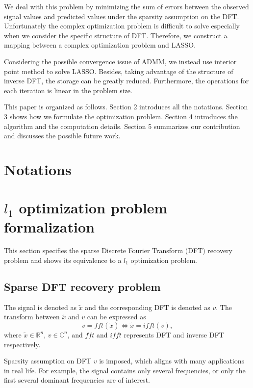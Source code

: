 \documentclass[final,onefignum,onetabnum]{siamart190516}
\newcounter{example}
\begin{document}
We deal with this problem by minimizing the sum of errors between the observed signal values and predicted values under the sparsity assumption on the DFT. Unfortunately the complex optimization problem is difficult to solve especially when we consider the specific structure of DFT. Therefore, we construct a mapping between a complex optimization problem and LASSO\cite{tibshirani1996regression}.

Considering the possible convergence issue of ADMM, we instead use interior point method to solve LASSO. Besides, taking advantage of the structure of inverse DFT, the storage can be greatly reduced. Furthermore, the operations for each iteration is linear in the problem size.

This paper is organized as follows. Section 2 introduces all the notations. Section 3 shows how we formulate the optimization problem. Section 4 introduces the algorithm and the computation details. Section 5 summarizes our contribution and discusses the possible future work.

\section{Notations}

\section{$l_1$ optimization problem formalization}
\label{sec:probemformalization}
This section specifies the sparse Discrete Fourier Transform (DFT) recovery problem and shows its equivalence to a $l_1$ optimization problem.

\subsection{Sparse DFT recovery problem}
\label{subsec:sparseDFTrecovery}
The signal is denoted as $\widetilde{x}$ and the corresponding DFT is denoted as $v$. The transform between $\widetilde{x}$ and $v$ can be expressed as
\begin{equation}
    v = fft(\widetilde{x}) \iff \widetilde{x} = ifft(v),
\end{equation}
where $\widetilde{x}\in \mathbb{R}^n$, $v\in \mathbb{C}^n$, and $fft$ and $ifft$ represents DFT and inverse DFT respectively.


Sparsity assumption  on DFT $v$ is imposed, which aligns with many applications in real life. For example, the signal contains only several frequencies, or only the first several dominant frequencies are of interest.
\end{document}
